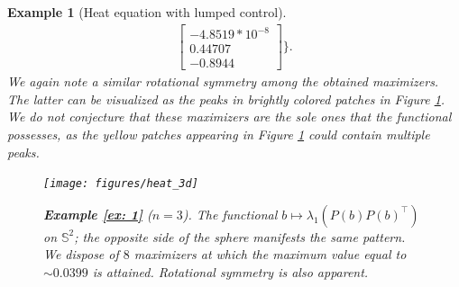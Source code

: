 \documentclass[journal,twoside,web]{ieeecolor}
\newtheorem{example}{Example}
\begin{document}
\begin{example}[Heat equation with lumped control]
\begin{align}
\begin{bmatrix} -4.8519*10^{-8}\\ 0.44707\\-0.8944\end{bmatrix} \Bigg\}.
	\end{align}
	We again note a similar rotational symmetry among the obtained maximizers. The latter can be visualized as the peaks in brightly colored patches in Figure \ref{fig: ex1.2}. We do not conjecture that these maximizers are the sole ones that the functional possesses, as the yellow patches appearing in Figure \ref{fig: ex1.2} could contain multiple peaks.
	
	\begin{figure}
	\begin{center}
	\texttt{[image: figures/heat\_3d]}	
	\end{center}
	\caption{\textbf{Example \ref{ex: 1}} ($n=3$). The functional $b\mapsto \lambda_1(P(b)P(b)^\top)$ on $\mathbb{S}^2$; the opposite side of the sphere manifests the same pattern. We dispose of $8$ maximizers at which the maximum value equal to $\sim0.0399$ is attained. 
	Rotational symmetry is also apparent.}
	  \label{fig: ex1.2}
	\end{figure}
	\end{example}
	\medskip
	
\end{document}
